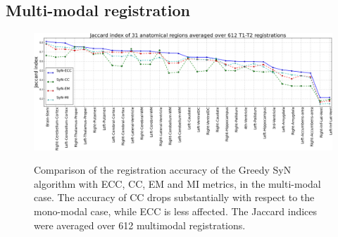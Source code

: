 \subsection{Multi-modal registration}\label{sec:multimodal_results}
\begin{figure}[t!]
\centering
\includegraphics[width=0.95\linewidth]{images/multi_lines_seg.png}\\
\caption{{\small Comparison of the registration accuracy of the Greedy SyN algorithm with ECC, CC, EM and MI metrics, in the multi-modal case. The accuracy of CC drops substantially with respect to the mono-modal case, while ECC is less affected. The Jaccard indices were averaged over 612 multimodal registrations.}}
\label{fig:multi_seg}\figcloser
\end{figure}
